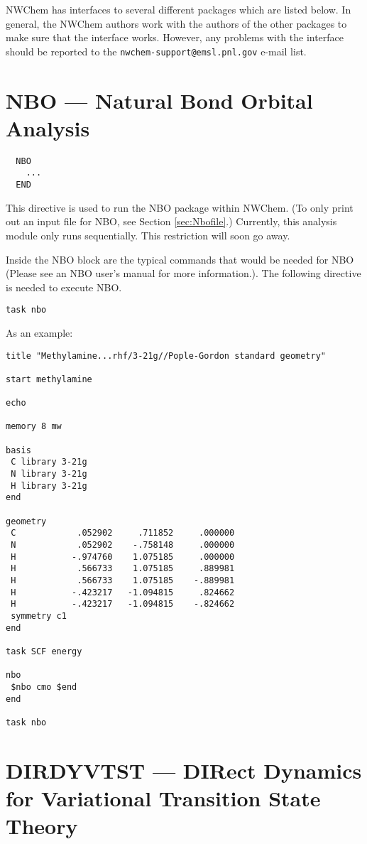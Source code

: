 \label{sec:interface}

NWChem has interfaces to several different packages which are listed below.
In general, the NWChem authors work with the authors of the other packages
to make sure that the interface works.  However, any problems with the 
interface should be reported to the
{\tt nwchem-support@emsl.pnl.gov} e-mail list.

\section{NBO --- Natural Bond Orbital Analysis}
\label{sec:nbo}
\begin{verbatim}
  NBO
    ...
  END
\end{verbatim}

This directive is used to run the NBO package within NWChem.  (To only print
out an input file for NBO, see Section \ref{sec:Nbofile}.)  Currently, this
analysis module only runs sequentially.  This restriction will soon go away.

Inside the NBO block are the typical commands that would be needed for NBO
(Please see an NBO user's manual for more information.).  The following
directive is needed to execute NBO.
\begin{verbatim}
task nbo
\end{verbatim}
As an example:

\begin{verbatim}
title "Methylamine...rhf/3-21g//Pople-Gordon standard geometry"

start methylamine

echo

memory 8 mw

basis
 C library 3-21g
 N library 3-21g
 H library 3-21g
end

geometry
 C            .052902     .711852     .000000
 N            .052902    -.758148     .000000
 H           -.974760    1.075185     .000000
 H            .566733    1.075185     .889981
 H            .566733    1.075185    -.889981
 H           -.423217   -1.094815     .824662
 H           -.423217   -1.094815    -.824662
 symmetry c1
end

task SCF energy

nbo
 $nbo cmo $end
end

task nbo 

\end{verbatim}

\section{DIRDYVTST --- DIRect Dynamics for Variational Transition State Theory}
\label{sec:dirdyvtst}

